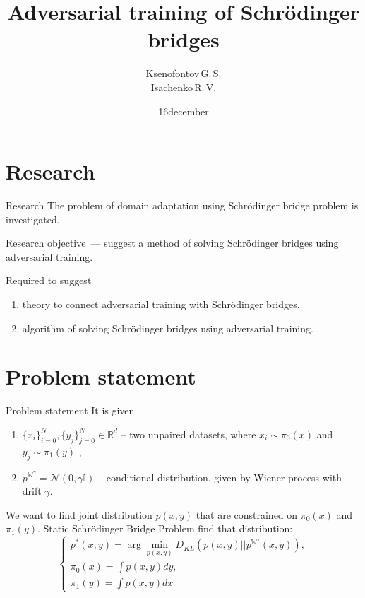 \documentclass[10pt,pdf,hyperref={unicode}]{beamer}
\title[]{Adversarial training of Schrödinger bridges}
\author{Ksenofontov\,G.\,S.\\[1ex] 
\small Isachenko\,R.\,V.}
\institute[]{Moscow Institute of Physics and Technology}
\date[2023]{\small 16\;december\;2023}
\begin{document}
\begin{frame}
\titlepage
\end{frame}

\section{Research}
\begin{frame}{Research}
\bigskip
The problem of domain adaptation using  Schrödinger bridge problem is investigated.
\begin{block}{Research objective~---}
suggest a method of solving Schrödinger bridges using adversarial training.
\end{block}
\begin{block}{Required to suggest}
\justifying
\begin{enumerate}[1.]
    \item theory to connect adversarial training with Schrödinger bridges,
    \item algorithm of solving Schrödinger bridges using adversarial training.
\end{enumerate}
\end{block}
\end{frame}
\section{Problem statement}
\begin{frame}{Problem statement}
It is given
\begin{enumerate}[1.]
    \item $\{x_i\}_{i=0}^N, \{y_j\}_{j=0}^N \in \mathbb{R}^d$ -- two unpaired datasets,  where $x_i \sim \pi_0(x)$ and $y_j \sim \pi_1(y)$ ,
    \item $p^{\mathbb{W}^\gamma}= \mathcal{N}(0, \gamma\mathbb{I})$ -- conditional distribution, given by Wiener process with drift $\gamma$.
\end{enumerate}


\bigskip
We want to find joint distribution $p(x, y)$ that are constrained on $\pi_0(x)$ and $\pi_1(y)$. Static Schrödinger Bridge Problem find that distribution:
\begin{equation}
    \left\{ \begin{array}{c}
    p^*(x,y) = \arg\min_{p(x,y)} D_{KL}(p(x,y)||p^{\mathbb{W}^\gamma}(x,y)), \\
    \pi_0(x) = \int p(x,y)dy, \\
    \pi_1(y) = \int p(x,y)dx
    \end{array}\right.
    \label{eq:static}
\end{equation}

\end{frame}
\end{document}
